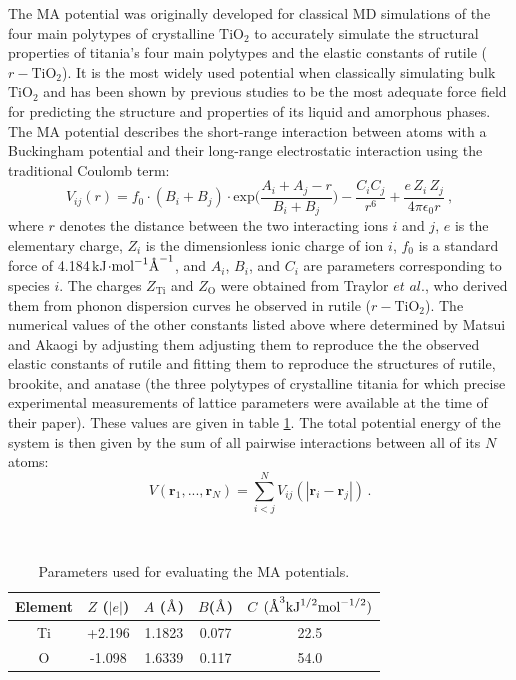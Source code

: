 \documentclass[aps,prb,twocolumn,amsmath,amssymb,superscriptaddress,longbibliography]{revtex4-1}
\newcommand{\angstrom}{\text{\normalfont\AA}}
\newcommand\tab[1][1cm]{\hspace*{#1}} %
\begin{document}
\tab The MA potential was originally developed for classical MD simulations of the four main polytypes of crystalline $\text{TiO}_2$\cite{MA_og} to accurately simulate the structural properties of titania's four main polytypes and the elastic constants of rutile ($r-\text{TiO}_2$). 
It is the most widely used potential when classically simulating bulk $\text{TiO}_2$ and has been shown by previous studies\cite{smith_collins,fichtorn,vvh1} to be the most adequate force field for predicting the structure and properties of its liquid and amorphous phases.
The MA potential describes the short-range interaction between atoms with a Buckingham potential and their long-range electrostatic interaction using the traditional Coulomb term:
\begin{equation}
V_{ij}(r) = f_{0}\cdot (B_i+B_j)\cdot\text{exp}\big(\frac{A_i + A_j - r}{B_i + B_j}\big) - \frac{C_{i}C_j}{r^6} + \frac{e\,Z_i\,Z_j}{4\pi\epsilon_0 r}\: ,
\end{equation}
where $r$ denotes the distance between the two interacting ions $i$ and $j$, $e$ is the elementary charge, $Z_i$ is the dimensionless ionic charge of ion $i$, $f_0$ is a standard force of 4.184$\,$kJ$\cdot\text{mol}^{-1}\angstrom^{-1}$, and $A_i$, $B_i$, and $C_i$ are parameters corresponding to species $i$.
The charges $Z_{\text{Ti}}$ and $Z_{\text{O}}$ were obtained from Traylor $\textit{et al.}$\cite{traylor}, who derived them from phonon dispersion curves he observed in rutile ($r-\text{TiO}_2$).
The numerical values of the other constants listed above where determined by Matsui and Akaogi by adjusting them adjusting them to reproduce the the observed elastic constants of rutile and fitting them to reproduce the structures of rutile, brookite, and anatase (the three polytypes of crystalline titania for which precise experimental measurements of lattice parameters were available at the time of their paper). 
These values are given in table \ref{classpot}.
The total potential energy of the system is then given by the sum of all pairwise interactions between all of its $N$ atoms:
\begin{equation}
V(\textbf{r}_1,...,\textbf{r}_N) = \sum_{i<j}^{N} V_{ij}(|\textbf{r}_i - \textbf{r}_j|)\, .
\end{equation}

\begin{table}[]
\centering
\caption{Parameters used for evaluating the MA potentials.}
\label{classpot}
\
\begin{tabular}{ccccc}
\hline
Element & $Z$ ($|e|$) & $A$ ($\angstrom$) & $B$($\angstrom$) & $C$ $(\angstrom^3\text{kJ}^{1/2}\text{mol}^{-1/2})$ \\ \hline
Ti      & +2.196      & 1.1823            & 0.077            & 22.5                                                \\
O       & -1.098      & 1.6339            & 0.117            & 54.0                                                \\ \hline
\end{tabular}
\end{table}
\end{document}
